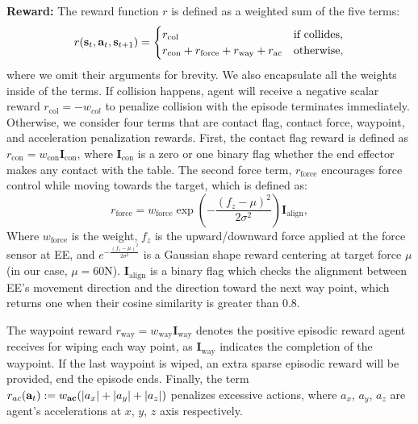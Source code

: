 \textbf{Reward:}
The reward function $r$ is defined as a weighted sum of the five terms:
\begin{equation}
r(\mathbf{s}_{t}, \mathbf{a}_{t}, \mathbf{s}_{t+1}) = 
\begin{cases} 
r_{\text{col}} & \text{if collides} , \\
r_{\text{con}} + r_{\text{force}} + r_{\text{way}} + r_{\text{ac}} & \text{otherwise},
\end{cases}
\label{eq:reward}
\end{equation}
where we omit their arguments for brevity. We also encapsulate all the weights inside of the terms.
If collision happens, agent will receive a negative scalar reward $r_{\text{col}} = -w_{col}$ to penalize collision with the episode terminates immediately. 
Otherwise, we consider four terms that are contact flag, contact force, waypoint, and acceleration penalization rewards.
First, the contact flag reward is defined as $r_{\text{con}} = w_{\text{con}} \mathbf{I}_{\text{con}}$, where $\mathbf{I}_{\text{con}}$ is a zero or one binary flag whether the end effector makes any contact with the table.
The second force term, $r_{\text{force}}$ encourages force control while moving towards the target, which is defined as:
\begin{equation}
r_{\text{force}} = w_{\text{force}} \exp\left( -\frac{(f_z-\mu)^2}{2\sigma^2} \right) \mathbf{I}_{\text{align}},
\label{eq:rt_force}
\end{equation}
Where $w_{\text{force}}$ is the weight, $f_z$ is the upward/downward force applied at the force sensor at EE, and  $e^{-\frac{(f_z-\mu)^2}{2\sigma^2}}$ is a Gaussian shape reward centering at target force $\mu$ (in our case, $\mu =60\text{N}$). 
$\mathbf{I}_{\text{align}}$ is a binary flag which checks the alignment between EE's movement direction and the direction toward the next way point, which returns one when their cosine similarity is greater than 0.8.

The waypoint reward $r_{\text{way}} = w_{\text{way}}\mathbf{I}_{\text{way}}$ denotes the positive episodic reward agent receives for wiping each way point, as $\mathbf{I}_{\text{way}}$ indicates the completion of the waypoint. If the last waypoint is wiped, an extra sparse episodic reward will be provided, end the episode ends. Finally, the term $r_{ac}(\mathbf{a}_{t}) := w_{\textbf{ac}}(|a_x| + |a_y| + |a_z|)$ penalizes excessive actions, where $a_x$, $a_y$, $a_z$ are agent's accelerations at $x$, $y$, $z$ axis respectively. 













